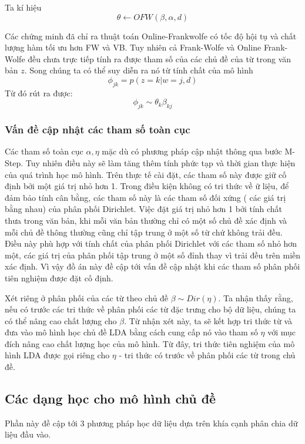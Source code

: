 \documentclass[fontsize=13pt]{scrartcl}
\begin{document}
Ta kí hiệu 
\begin{equation}
\theta \leftarrow OFW(\beta,\alpha,d)
\end{equation}

Các chứng minh đã chỉ ra thuật toán Online-Frankwolfe có tốc độ hội tụ và chất lượng hàm tối ưu hơn FW và VB. Tuy nhiên cả Frank-Wolfe và Online Frank-Wolfe đều chưa trực tiếp tính ra được tham số của các chủ đề của từ trong văn bản $z$. Song chúng ta có thể suy diễn ra nó từ tính chất của mô hình
\begin{equation}
\phi_{jk} = p(z = k | w = j, d)
\end{equation}
Từ đó rút ra được:
\begin{equation}
\phi_{jk} \sim \theta_{k}\beta_{kj}
\end{equation}

\subsubsection{Vấn đề cập nhật các tham số toàn cục}
Các tham số toàn cục $\alpha,\eta$ mặc dù có phương pháp cập nhật thông qua bước M-Step. Tuy nhiên điều này sẽ làm tăng thêm tính phức tạp và thời gian thực hiện của quá trình học mô hình. Trên thực tế cài đặt, các tham số này được giữ cố định bởi một giá trị nhỏ hơn 1. Trong điều kiện không có tri thức về ữ liệu, để đảm bảo tính cân bằng, các tham số này là các tham số đối xứng ( các giá trị bằng nhau) của phân phối Dirichlet. Việc đặt giá trị nhỏ hơn 1 bởi tính chất thưa trong văn bản, khi mỗi văn bản thường chỉ có một số chủ đề xác định và mỗi chủ đề thông thường cũng chỉ tập trung ở một số từ chứ không trải đều. Điều này phù hợp với tính chất của phân phối Dirichlet với các tham số nhỏ hơn một, các giá trị của phân phối tập trung ở một số đỉnh thay vì trải đều trên miền xác định. Vì vậy đồ án này đề cập tới vấn đề cập nhật khi các tham số phân phối tiên nghiệm được đặt cố định.
\par
Xét riêng ở phân phối của các từ theo chủ đề $\beta \sim Dir(\eta)$. Ta nhận thấy rằng, nếu có trước các tri thức về phân phối các từ đặc trưng cho bộ dữ liệu, chúng ta có thể nâng cao chất lượng cho $\beta$.  Từ nhận xét này, ta sẽ kết hợp tri thức từ và đưa vào mô hình học chủ đề LDA bằng cách cung cấp nó vào tham số $\eta$ với mục đích nâng cao chất lượng học của mô hình. Từ đây,  tri thức tiên nghiệm của mô hình LDA được gọi riêng cho $\eta$ - tri thức có trước về phân phối các từ trong chủ đề.  
\subsection{Các dạng học cho mô hình chủ đề}
Phần này đề cập tới 3 phương pháp học dữ liệu dựa trên khía cạnh phân chia dữ liệu đầu vào.
\end{document}
